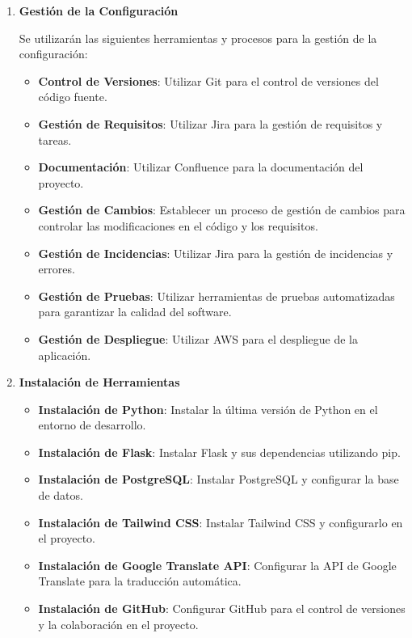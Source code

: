 \begin{doublespace}
\begin{enumerate}[label=\alph*)]
\begin{enumerate}
        \item \textbf{Gestión de la Configuración}\par
        Se utilizarán las siguientes herramientas y procesos para la gestión de la configuración:

        \begin{itemize}
            \item \textbf{Control de Versiones}: Utilizar Git para el control de versiones del código fuente.
            \item \textbf{Gestión de Requisitos}: Utilizar Jira para la gestión de requisitos y tareas.
            \item \textbf{Documentación}: Utilizar Confluence para la documentación del proyecto.
            \item \textbf{Gestión de Cambios}: Establecer un proceso de gestión de cambios para controlar las modificaciones en el código y los requisitos.
            \item \textbf{Gestión de Incidencias}: Utilizar Jira para la gestión de incidencias y errores.
            \item \textbf{Gestión de Pruebas}: Utilizar herramientas de pruebas automatizadas para garantizar la calidad del software.
            \item \textbf{Gestión de Despliegue}: Utilizar AWS para el despliegue de la aplicación.
        \end{itemize}
        \item \textbf{Instalación de Herramientas}\par
        \begin{itemize}
            \item \textbf{Instalación de Python}: Instalar la última versión de Python en el entorno de desarrollo.
            \item \textbf{Instalación de Flask}: Instalar Flask y sus dependencias utilizando pip.
            \item \textbf{Instalación de PostgreSQL}: Instalar PostgreSQL y configurar la base de datos.
            \item \textbf{Instalación de Tailwind CSS}: Instalar Tailwind CSS y configurarlo en el proyecto.
            \item \textbf{Instalación de Google Translate API}: Configurar la API de Google Translate para la traducción automática.
            \item \textbf{Instalación de GitHub}: Configurar GitHub para el control de versiones y la colaboración en el proyecto.

\end{itemize}
\end{enumerate}
\end{enumerate}
\end{doublespace}
